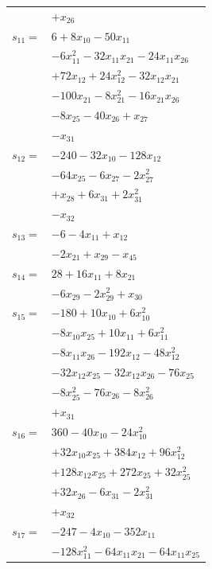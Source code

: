 \begin{longtable}{@{}r@{\;}l@{}}
 & \(\displaystyle +x_{26}\) \\[3pt]
\(s_{11}=\) & \(\displaystyle 6 +8x_{10} -50x_{11}\) \\
 & \(\displaystyle -6x_{11}^{2} -32x_{11}x_{21} -24x_{11}x_{26}\) \\
 & \(\displaystyle +72x_{12} +24x_{12}^{2} -32x_{12}x_{21}\) \\
 & \(\displaystyle -100x_{21} -8x_{21}^{2} -16x_{21}x_{26}\) \\
 & \(\displaystyle -8x_{25} -40x_{26} +x_{27}\) \\
 & \(\displaystyle -x_{31}\) \\[3pt]
\(s_{12}=\) & \(\displaystyle -240 -32x_{10} -128x_{12}\) \\
 & \(\displaystyle -64x_{25} -6x_{27} -2x_{27}^{2}\) \\
 & \(\displaystyle +x_{28} +6x_{31} +2x_{31}^{2}\) \\
 & \(\displaystyle -x_{32}\) \\[3pt]
\(s_{13}=\) & \(\displaystyle -6 -4x_{11} +x_{12}\) \\
 & \(\displaystyle -2x_{21} +x_{29} -x_{45}\) \\[3pt]
\(s_{14}=\) & \(\displaystyle 28 +16x_{11} +8x_{21}\) \\
 & \(\displaystyle -6x_{29} -2x_{29}^{2} +x_{30}\) \\[3pt]
\(s_{15}=\) & \(\displaystyle -180 +10x_{10} +6x_{10}^{2}\) \\
 & \(\displaystyle -8x_{10}x_{25} +10x_{11} +6x_{11}^{2}\) \\
 & \(\displaystyle -8x_{11}x_{26} -192x_{12} -48x_{12}^{2}\) \\
 & \(\displaystyle -32x_{12}x_{25} -32x_{12}x_{26} -76x_{25}\) \\
 & \(\displaystyle -8x_{25}^{2} -76x_{26} -8x_{26}^{2}\) \\
 & \(\displaystyle +x_{31}\) \\[3pt]
\(s_{16}=\) & \(\displaystyle 360 -40x_{10} -24x_{10}^{2}\) \\
 & \(\displaystyle +32x_{10}x_{25} +384x_{12} +96x_{12}^{2}\) \\
 & \(\displaystyle +128x_{12}x_{25} +272x_{25} +32x_{25}^{2}\) \\
 & \(\displaystyle +32x_{26} -6x_{31} -2x_{31}^{2}\) \\
 & \(\displaystyle +x_{32}\) \\[3pt]
\(s_{17}=\) & \(\displaystyle -247 -4x_{10} -352x_{11}\) \\
 & \(\displaystyle -128x_{11}^{2} -64x_{11}x_{21} -64x_{11}x_{25}\) \\

\end{longtable}
